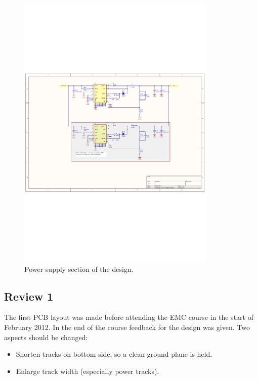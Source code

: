 \begin{figure}[H]
	\begin{centering}
		 \includegraphics[width=0.85\textwidth,page=1,angle=0]{images/SIG60_v0_4}
		\caption{Power supply section of the design.}
	\end{centering}
\end{figure}

\subsection{Review 1}
The first PCB layout was made before attending the EMC course in the start of February 2012. In the end of the course feedback for the design was given. Two aspects should be changed:
\begin{itemize}
	\item Shorten tracks on bottom side, so a clean ground plane is held. 
	\item Enlarge track width (especially power tracks).
\end{itemize}

